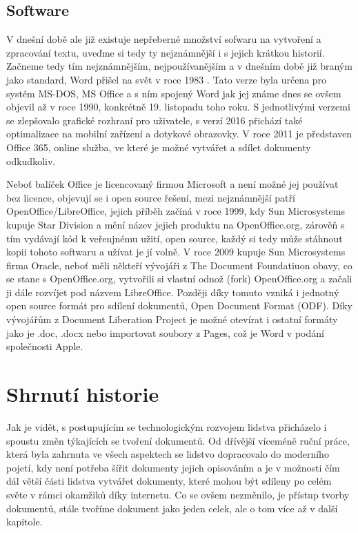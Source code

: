 \subsection{Software}

V dnešní době ale již existuje nepřeberné množství sofwaru na vytvoření a zpracování textu, uveďme si tedy ty nejznámnější i s jejich krátkou historií. Začneme tedy
tím nejznámnějším, nejpoužívanějším a v dnešním době již braným jako standard, Word přišel na svět v roce 1983 \cite{word83}. Tato verze byla určena pro systém MS-DOS,
MS Office a s ním spojený Word jak jej známe dnes se ovšem objevil až v roce 1990, konkrétně 19. listopadu toho roku. S jednotlivými verzemi se zlepšovalo grafické
rozhraní pro uživatele, s verzí 2016 přichází také optimalizace na mobilní zařízení a dotykové obrazovky. V roce 2011 je představen Office 365, online služba, ve
které je možné vytvářet a sdílet dokumenty odkudkoliv. \cite{word}

Neboť balíček Office je licencovaný firmou Microsoft a není možné jej používat bez licence, objevují se i open source řešení, mezi nejznámnější patří OpenOffice/LibreOffice,
jejich příběh začíná v roce 1999, kdy Sun Microsystems kupuje Star Division a mění název jejich produktu na OpenOffice.org, zárověň s tím vydávají kód k veřenjnému užití, open source,
každý si tedy může stáhnout kopii tohoto softwaru a užívat je jí volně. V roce 2009 kupuje Sun Microsystems firma Oracle, neboť měli někteří vývojáři z The Document Foundatiuon obavy,
co se stane s OpenOffice.org, vytvořili si vlastní odnož (fork) OpenOffice.org a začali ji dále rozvíjet pod názvem LibreOffice. Později díky tomuto vzniká i jednotný open source
formát pro sdílení dokumentů, Open Document Format (ODF). Díky vývojářům z Document Liberation Project je možné otevírat i ostatní formáty jako je .doc, .docx nebo importovat
soubory z Pages, což je Word v podání společnosti Apple. \cite{LibreHist}

\section{Shrnutí historie}

Jak je vidět, s postupujícím se technologickým rozvojem lidstva přicházelo i spoustu změn týkajících se tvoření dokumentů. Od dřívější víceméně ruční práce, která byla zahrnuta
ve všech aspektech se lidstvo dopracovalo do moderního pojetí, kdy není potřeba šířit dokumenty jejich opisováním a je v možnosti čím dál větší části lidstva vytvářet dokumenty,
které mohou být sdíleny po celém světe v rámci okamžiků díky internetu. Co se ovšem nezměnilo, je přístup tvorby dokumentů, stále tvoříme dokument jako jeden celek, ale o tom více
až v další kapitole.